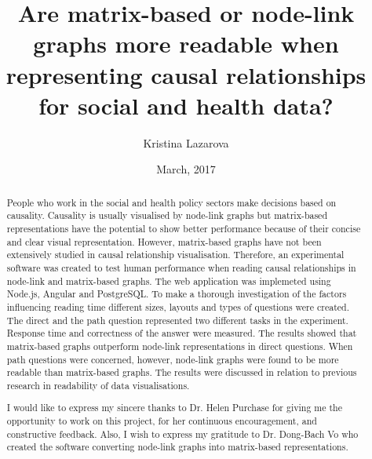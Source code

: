 \documentclass{l4proj}
\begin{document}
\title{Are matrix-based or node-link graphs more readable when representing causal relationships for social and health data?}
\author{Kristina Lazarova}
\date{March, 2017}
\maketitle


\begin{abstract}

People who work in the social and health policy sectors make decisions based on causality. Causality is usually visualised by node-link graphs but matrix-based representations have the potential to show better performance because of their concise and clear visual representation. However, matrix-based graphs have not been extensively studied in causal relationship visualisation. Therefore, an experimental software was created to test human performance when reading causal relationships in node-link and matrix-based graphs. The web application was implemeted using Node.js, Angular and PostgreSQL. To make a thorough investigation of the factors influencing reading time different sizes, layouts and types of questions were created. The direct and the path question represented two different tasks in the experiment. Response time and correctness of the answer were measured. The results showed that matrix-based graphs outperform node-link representations in direct questions. When path questions were concerned, however, node-link graphs were found to be more readable than matrix-based graphs. The results were discussed in relation to previous research in readability of data visualisations.

\end{abstract}


\renewcommand{\abstractname}{Acknowledgements}
\begin{abstract}
I would like to express my sincere thanks to Dr. Helen Purchase for giving me the opportunity to work on this project, for her continuous encouragement, and constructive feedback. Also, I wish to express my gratitude to Dr. Dong-Bach Vo who created the software converting node-link graphs into matrix-based representations. 

\end{abstract}


\educationalconsent
%
%
\tableofcontents
\end{document}
